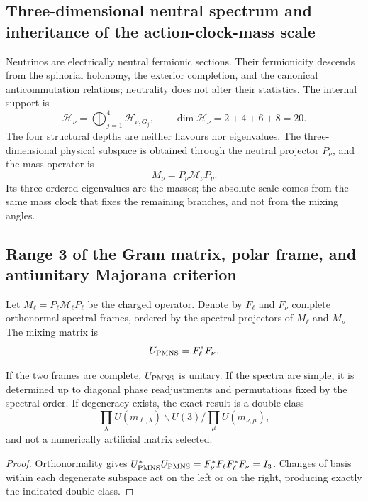 \subsection{Three-dimensional neutral spectrum and inheritance of the action-clock-mass scale}

Neutrinos are electrically neutral fermionic sections. Their
fermionicity descends from the spinorial holonomy, the exterior completion, and
the canonical anticommutation relations; neutrality does not alter their
statistics. The internal support is
\[
 \mathcal H_\nu=
 \bigoplus_{j=1}^{4}\mathcal H_{\nu,G_j},
 \qquad
 \dim\mathcal H_\nu=2+4+6+8=20.
\]
The four structural depths are neither flavours nor eigenvalues. The
three-dimensional physical subspace is obtained through the neutral projector
\(P_\nu\), and the mass operator is
\[
 M_\nu=P_\nu\mathcal M_\nu P_\nu.
\]
Its three ordered eigenvalues are the masses; the absolute scale comes from the
same mass clock that fixes the remaining branches, and not from the mixing angles.

\subsection{Range 3 of the Gram matrix, polar frame, and antiunitary Majorana criterion}

Let \(M_\ell=P_\ell\mathcal M_\ell P_\ell\) be the charged operator. Denote by
\(F_\ell\) and \(F_\nu\) complete orthonormal spectral frames, ordered by
the spectral projectors of \(M_\ell\) and \(M_\nu\). The mixing matrix is
\[
 U_{\rm PMNS}=F_\ell^*F_\nu.
\]

\begin{theorem}
If the two frames are complete, \(U_{\rm PMNS}\) is unitary. If the
spectra are simple, it is determined up to diagonal phase readjustments and
permutations fixed by the spectral order. If degeneracy exists, the
exact result is a double class
\[
 \prod_\lambda U(m_{\ell,\lambda})
 \backslash U(3) /
 \prod_\mu U(m_{\nu,\mu}),
\]
and not a numerically artificial matrix selected.
\end{theorem}

\begin{proof}
Orthonormality gives
\(U_{\rm PMNS}^*U_{\rm PMNS}=F_\nu^*F_\ell F_\ell^*F_\nu=I_3\).
Changes of basis within each degenerate subspace act on the
left or on the right, producing exactly the indicated
double class.
\end{proof}

